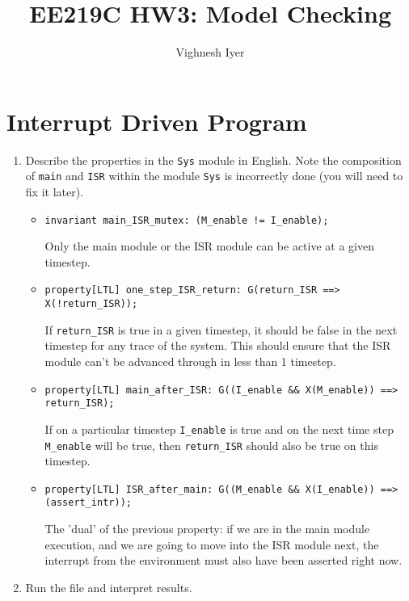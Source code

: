 

\title{EE219C HW3: Model Checking}
\author{Vighnesh Iyer}
\date{}
\maketitle

\section{Interrupt Driven Program}
\begin{enumerate}[label=(\alph*)]
  \item {\color{blue} Describe the properties in the \texttt{Sys} module in English.
    Note the composition of \texttt{main} and \texttt{ISR} within the module \texttt{Sys} is incorrectly done (you will need to fix it later).}

    \begin{itemize}
      \item \verb|invariant main_ISR_mutex: (M_enable != I_enable);|

        Only the main module or the ISR module can be active at a given timestep.

      \item \verb|property[LTL] one_step_ISR_return: G(return_ISR ==> X(!return_ISR));|

        If \verb|return_ISR| is true in a given timestep, it should be false in the next timestep for any trace of the system.
        This should ensure that the ISR module can't be advanced through in less than 1 timestep.

      \item \verb|property[LTL] main_after_ISR: G((I_enable && X(M_enable)) ==> return_ISR);|

        If on a particular timestep \verb|I_enable| is true and on the next time step \verb|M_enable| will be true, then \verb|return_ISR| should also be true on this timestep.

      \item \verb|property[LTL] ISR_after_main: G((M_enable && X(I_enable)) ==> (assert_intr));|

        The 'dual' of the previous property: if we are in the main module execution, and we are going to move into the ISR module next, the interrupt from the environment must also have been asserted right now.
    \end{itemize}

  \item {\color{blue} Run the file and interpret results.}


\end{enumerate}
